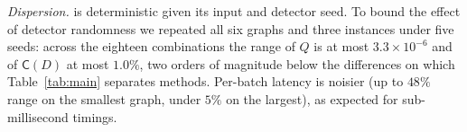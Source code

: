 \emph{Dispersion.} \DyLo{} is deterministic given its input and detector seed.
To bound the effect of detector randomness we repeated all six graphs and three
instances under five seeds: across the eighteen combinations the range of $Q$ is
at most $3.3\times10^{-6}$ and of $\mathsf C(D)$ at most $1.0\%$, two orders of
magnitude below the differences on which Table~\ref{tab:main} separates methods.
Per-batch latency is noisier (up to $48\%$ range on the smallest graph, under
$5\%$ on the largest), as expected for sub-millisecond timings.

